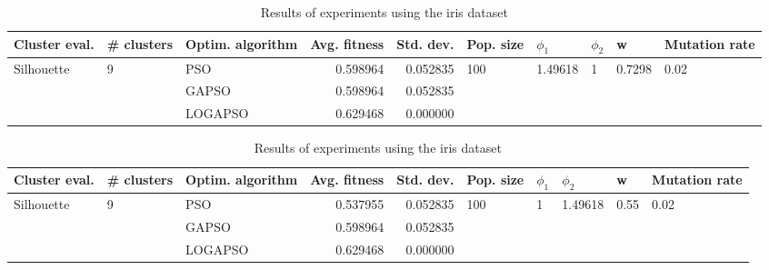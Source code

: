 \documentclass{article}
\begin{document}
\begin{table}
\centering
\caption{Results of experiments using the iris dataset}
\begin{tabular}{lllrrlllll}
\toprule
              Cluster eval. &        \# clusters & Optim. algorithm &  Avg. fitness &  Std. dev. &            Pop. size &               $\phi_{1}$ &         $\phi_{2}$ &                       w &         Mutation rate \\
\midrule
\multirow{3}{*}{Silhouette} & \multirow{3}{*}{9} &              PSO &      0.598964 &   0.052835 & \multirow{3}{*}{100} & \multirow{3}{*}{1.49618} & \multirow{3}{*}{1} & \multirow{3}{*}{0.7298} & \multirow{3}{*}{0.02} \\
                            &                    &            GAPSO &      0.598964 &   0.052835 &                      &                          &                    &                         &                       \\
                            &                    &          LOGAPSO &      0.629468 &   0.000000 &                      &                          &                    &                         &                       \\
\bottomrule
\end{tabular}
\end{table}
\begin{table}
\centering
\caption{Results of experiments using the iris dataset}
\begin{tabular}{lllrrlllll}
\toprule
              Cluster eval. &        \# clusters & Optim. algorithm &  Avg. fitness &  Std. dev. &            Pop. size &         $\phi_{1}$ &               $\phi_{2}$ &                     w &         Mutation rate \\
\midrule
\multirow{3}{*}{Silhouette} & \multirow{3}{*}{9} &              PSO &      0.537955 &   0.052835 & \multirow{3}{*}{100} & \multirow{3}{*}{1} & \multirow{3}{*}{1.49618} & \multirow{3}{*}{0.55} & \multirow{3}{*}{0.02} \\
                            &                    &            GAPSO &      0.598964 &   0.052835 &                      &                    &                          &                       &                       \\
                            &                    &          LOGAPSO &      0.629468 &   0.000000 &                      &                    &                          &                       &                       \\
\bottomrule
\end{tabular}
\end{table}
\end{document}

